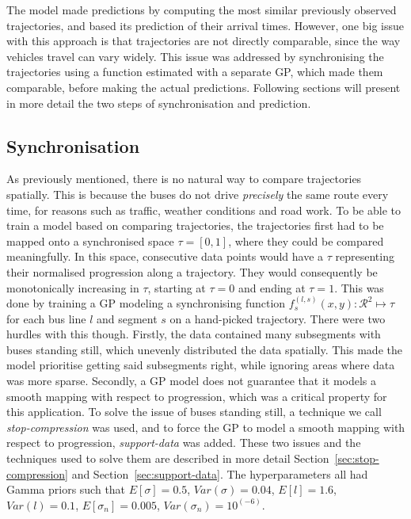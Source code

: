 The model made predictions by computing the
most similar previously observed trajectories, and
based its prediction of their arrival times.
However, one big issue with this approach is that
trajectories are not directly comparable, since
the way vehicles travel can vary widely. This issue
was addressed by synchronising the trajectories using a
function estimated with a separate GP, which made them comparable,
before making the actual predictions. Following sections will present
in more detail the two steps of synchronisation and prediction.

\subsection{Synchronisation}
As previously mentioned, there is no natural way to compare
trajectories spatially. This is because the buses do not drive
\textit{precisely} the same route every time, for reasons such as
traffic, weather conditions and road work. To be able to train a model
based on comparing trajectories, the trajectories first had to be
mapped onto a synchronised space $\tau = [0, 1]$, where they could be
compared meaningfully. In this space, consecutive data points would
have a $\tau$ representing their normalised progression along a
trajectory. They would consequently be monotonically increasing in
$\tau$, starting at $\tau=0$ and ending at $\tau=1$. This was done by
training a GP modeling a synchronising function $f^{(l,s)}_s(x, y) : \mathcal{R}^2 \mapsto
\tau$ for each bus line $l$ and segment $s$ on a hand-picked
trajectory. There were two hurdles with this though. Firstly, the data
contained many subsegments with buses standing still, which unevenly
distributed the data spatially. This made the model prioritise getting
said subsegments right, while ignoring areas where data was more
sparse. Secondly, a GP model does not guarantee that
it models a smooth mapping with respect to progression, which was a
critical property for this application. To solve the issue of buses
standing still, a technique we call \textit{stop-compression} was
used, and to force the GP to model a smooth mapping with respect to
progression, \textit{support-data} was added. These two issues and the techniques used to solve
them are described in more detail Section~\ref{sec:stop-compression}
and Section~\ref{sec:support-data}. The
hyperparameters all had Gamma priors such that $E[\sigma] = 0.5$,
$Var(\sigma) = 0.04$, $E[l] = 1.6$, $Var(l) = 0.1$,
$E[\sigma_n]= 0.005$, $Var(\sigma_n) = 10^{(-6)}$.

